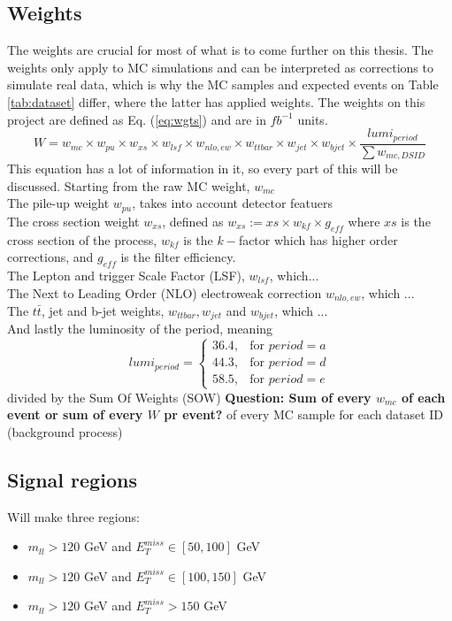 \documentclass[12pt, a4paper]{book}
\begin{document}
\subsection{Weights}\label{sec:wgts}
The weights are crucial for most of what is to come further on this thesis. The weights only apply to MC simulations and can be interpreted as corrections to simulate real data, which is why the MC samples and expected events on Table \ref{tab:dataset} differ, where the 
latter has applied weights. The weights on this project are defined as Eq. (\ref{eq:wgts}) and are in $fb^{-1}$ units.
\begin{equation}\label{eq:wgts}
   W = w_{mc}\times w_{pu}\times w_{xs}\times w_{lsf} \times w_{nlo,ew} \times w_{ttbar} \times w_{jet} \times w_{bjet} \times \frac{lumi_{period}}{\sum w_{mc, DSID}}
\end{equation}
This equation has a lot of information in it, so every part of this will be discussed. Starting from the raw MC weight, $w_{mc}$\\
The pile-up weight $w_{pu}$, takes into account detector featuers\\
The cross section weight $w_{xs}$, defined as $w_{xs} := xs \times w_{kf} \times g_{eff}$ where $xs$ is the cross section of the process, $w_{kf}$ is the $k-$factor which has higher order corrections, and $g_{eff}$ is the filter efficiency.\\
The Lepton and trigger Scale Factor (LSF), $w_{lsf}$, which...\\
The Next to Leading Order (NLO) electroweak correction $w_{nlo,ew}$, which ...\\
The $t\bar{t}$, jet and b-jet weights, $w_{ttbar}, w_{jet}$ and $w_{bjet}$, which ...\\
And lastly the luminosity of the period, meaning
$$
lumi_{period} = \begin{cases}
               36.4,& \text{for } period = a\\
               44.3,& \text{for } period = d\\
               58.5,& \text{for } period = e
               \end{cases}
$$
divided by the Sum Of Weights (SOW) \textbf{Question: Sum of every $w_{mc}$ of each event or sum of every $W$ pr event? } of every MC sample for each dataset ID (background process)

\subsection{Signal regions}
Will make three regions:
\begin{itemize}
   \item $m_{ll} >120$ GeV and $E_T^{miss} \in [50, 100]$ GeV
   \item $m_{ll} >120$ GeV and $E_T^{miss} \in [100, 150]$ GeV
   \item $m_{ll} >120$ GeV and $E_T^{miss} >150$ GeV
\end{itemize}
\end{document}

